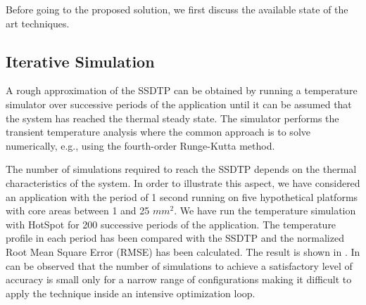 Before going to the proposed solution, we first discuss the available state of the art techniques.

\subsection{Iterative Simulation} \label{sec:hotspot-iterative-solution}
A rough approximation of the SSDTP can be obtained by running a temperature simulator over successive periods of the application until it can be assumed that the system has reached the thermal steady state. The simulator performs the transient temperature analysis where the common approach is to solve  numerically, e.g., using the fourth-order Runge-Kutta method.

The number of simulations required to reach the SSDTP depends on the thermal characteristics of the system. In order to illustrate this aspect, we have considered an application with the period of 1 second running on five hypothetical platforms with core areas between 1 and 25 $mm^2$. We have run the temperature simulation with HotSpot \cite{huang2006} for 200 successive periods of the application. The temperature profile in each period has been compared with the SSDTP and the normalized Root Mean Square Error (RMSE) has been calculated. The result is shown in . In can be observed that the number of simulations to achieve a satisfactory level of accuracy is small only for a narrow range of configurations making it difficult to apply the technique inside an intensive optimization loop.

